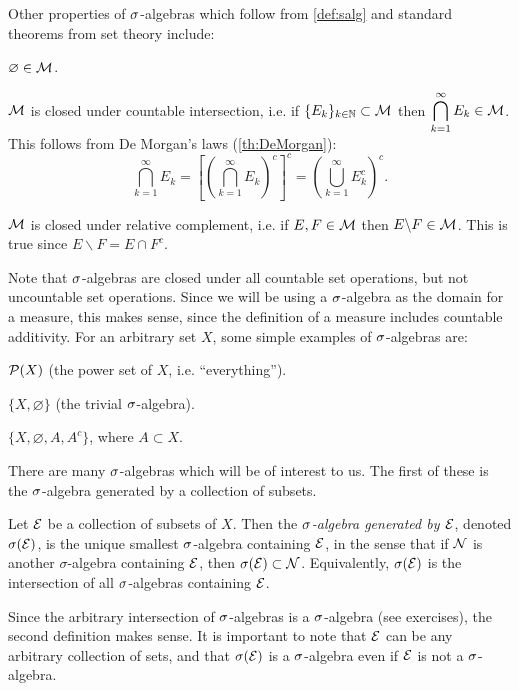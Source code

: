 \documentclass[main.tex]{subfiles}
\begin{document}
Other properties of ${\sigma}$-algebras which follow from \cref{def:salg} and standard theorems from set theory include:
\begin{romannum}\setcounter{rmnum}{3}
	\item $\varnothing \in {\mathcal M}$.
	\item ${\mathcal M}$ is closed under countable intersection, i.e. if $\{E_k\}_{k \in {\mathbb N}} \subset {\mathcal M}$ then $\begin{aligned}\bigcap_{k=1}^\infty E_k \in {\mathcal M} \end{aligned}$. This follows from De Morgan's laws (\cref{th:DeMorgan}):
	\[
	\bigcap_{k=1}^\infty E_k = \left[ \left( \bigcap_{k=1}^\infty E_k \right)^c \right]^c
	= \left( \bigcup_{k=1}^\infty E_k^c \right)^c.
	\]
	\item ${\mathcal M}$ is closed under relative complement, i.e. if $E, F \in {\mathcal M}$ then $E \backslash F \in {\mathcal M}$. This is true since $E \backslash F = E \cap F^c$.
\end{romannum}

Note that ${\sigma}$-algebras are closed under all countable set operations, but not uncountable set operations. Since we will be using a ${\sigma}$-algebra as the domain for a measure, this makes sense, since the definition of a measure includes countable additivity. For an arbitrary set $X$, some simple examples of ${\sigma}$-algebras are:
\begin{remunerate}
\item ${\mathcal P}(X)$ (the power set of $X$, i.e. ``everything'').
\item $\{ X, \varnothing \}$ (the trivial ${\sigma}$-algebra).
\item $\{ X, \varnothing, A, A^c \}$, where $A \subset X$.
\end{remunerate}

There are many ${\sigma}$-algebras which will be of interest to us. The first of these is the ${\sigma}$-algebra generated by a collection of subsets.

\begin{definition}Let ${\mathcal E}$ be a collection of subsets of $X$. Then the \emph{${\sigma}$-algebra generated by ${\mathcal E}$}, denoted ${\sigma}({\mathcal E})$, is the unique smallest ${\sigma}$-algebra containing ${\mathcal E}$, in the sense that if ${\mathcal N}$ is another $\sigma$-algebra containing ${\mathcal E}$, then ${\sigma}({\mathcal E}) \subset {\mathcal N}$. Equivalently, ${\sigma}({\mathcal E})$ is the intersection of all ${\sigma}$-algebras containing ${\mathcal E}$.
\end{definition}

Since the arbitrary intersection of ${\sigma}$-algebras is a ${\sigma}$-algebra (see exercises), the second definition makes sense. It is important to note that ${\mathcal E}$ can be any arbitrary collection of sets, and that ${\sigma}({\mathcal E})$ is a ${\sigma}$-algebra even if ${\mathcal E}$ is not a ${\sigma}$-algebra.
\end{document}
